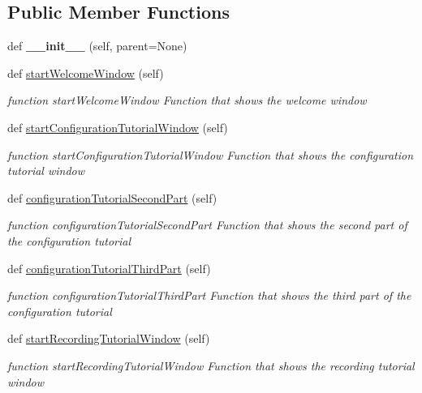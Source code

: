 \subsection*{Public Member Functions}
\begin{DoxyCompactItemize}
\item 
def {\bfseries \+\_\+\+\_\+init\+\_\+\+\_\+} (self, parent=None)\hypertarget{classGUI__node_1_1MainWindow_a91cc7c05ff8bf1511cd5261e7325a126}{}\label{classGUI__node_1_1MainWindow_a91cc7c05ff8bf1511cd5261e7325a126}

\item 
def \hyperlink{classGUI__node_1_1MainWindow_a9d070f64208c98d3567b1275b7d35e07}{start\+Welcome\+Window} (self)
\begin{DoxyCompactList}\small\item\em function start\+Welcome\+Window Function that shows the welcome window \end{DoxyCompactList}\item 
def \hyperlink{classGUI__node_1_1MainWindow_add9380f974135deaf470c8ed010d8726}{start\+Configuration\+Tutorial\+Window} (self)
\begin{DoxyCompactList}\small\item\em function start\+Configuration\+Tutorial\+Window Function that shows the configuration tutorial window \end{DoxyCompactList}\item 
def \hyperlink{classGUI__node_1_1MainWindow_a835e01e508e046a1f89c6422704dc9be}{configuration\+Tutorial\+Second\+Part} (self)
\begin{DoxyCompactList}\small\item\em function configuration\+Tutorial\+Second\+Part Function that shows the second part of the configuration tutorial \end{DoxyCompactList}\item 
def \hyperlink{classGUI__node_1_1MainWindow_a095f642c8d8aba490bbae131c8b6c89b}{configuration\+Tutorial\+Third\+Part} (self)
\begin{DoxyCompactList}\small\item\em function configuration\+Tutorial\+Third\+Part Function that shows the third part of the configuration tutorial \end{DoxyCompactList}\item 
def \hyperlink{classGUI__node_1_1MainWindow_abe0d2c5692579f0e853c22cd9d9885d5}{start\+Recording\+Tutorial\+Window} (self)
\begin{DoxyCompactList}\small\item\em function start\+Recording\+Tutorial\+Window Function that shows the recording tutorial window \end{DoxyCompactList}\item 

\end{DoxyCompactItemize}
